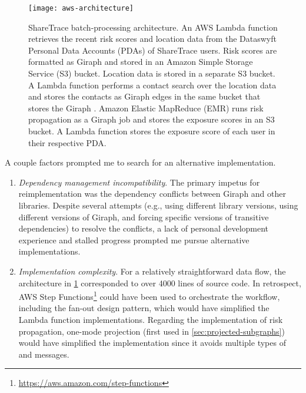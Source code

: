\begin{figure}[htbp]
\centering
\texttt{[image: aws-architecture]}
\caption[ShareTrace batch-processing architecture]{ShareTrace batch-processing architecture.  An AWS Lambda function\protect\footnotemark{} retrieves the recent risk scores and location data from the Dataswyft Personal Data Accounts (PDAs) of ShareTrace users. Risk scores are formatted as Giraph \verticesName and stored in an Amazon Simple Storage Service\protect\footnotemark{} (S3) bucket. Location data is stored in a separate S3 bucket.  A Lambda function performs a contact search over the location data and stores the contacts as Giraph edges in the same bucket that stores the Giraph \verticesName.  Amazon Elastic MapReduce\protect\footnotemark{} (EMR) runs risk propagation as a Giraph job and stores the exposure scores in an S3 bucket.  A Lambda function stores the exposure score of each user in their respective PDA.}
\label{fig:aws-architecture}
\end{figure}

\addtocounter{footnote}{-1}
\addtocounter{footnote}{-1}
\addtocounter{footnote}{1}
\addtocounter{footnote}{1}

\clearpage

A couple factors prompted me to search for an alternative implementation.
  \begin{enumerate}
    \item \emph{Dependency management incompatibility}. The primary impetus for reimplementation was the dependency conflicts between Giraph and other libraries. Despite several attempts (e.g., using different library versions, using different versions of Giraph, and forcing specific versions of transitive dependencies) to resolve the conflicts, a lack of personal development experience and stalled progress prompted me pursue alternative implementations.
    \item \emph{Implementation complexity}. For a relatively straightforward data flow, the architecture in \cref{fig:aws-architecture} corresponded to over \num{4000} lines of source code. In retrospect, AWS Step Functions\footnote{\url{https://aws.amazon.com/step-functions}} could have been used to orchestrate the workflow, including the fan-out design pattern, which would have simplified the Lambda function implementations. Regarding the implementation of risk propagation, one-mode projection (first used in \cref{sec:projected-subgraphs}) would have simplified the implementation since it avoids multiple types of \verticesName and messages.
  \end{enumerate}

